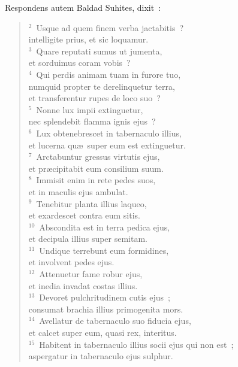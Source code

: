 \lettrine[lines=10,image=true,loversize=0.05,lraise=-0.03]{R}{}espondens autem Baldad Suhites, dixit~:
\begin{flushleft}\begin{verse}\vspace{6pt}${}^{2}$~Usque ad quem finem verba jactabitis~?\\ intelligite prius, et sic loquamur.\\
${}^{3}$~Quare reputati sumus ut jumenta,\\ et sorduimus coram vobis~?\\
${}^{4}$~Qui perdis animam tuam in furore tuo,\\ numquid propter te derelinquetur terra,\\ et transferentur rupes de loco suo~?\\
${}^{5}$~Nonne lux impii extinguetur,\\ nec splendebit flamma ignis ejus~?\\
${}^{6}$~Lux obtenebrescet in tabernaculo illius,\\ et lucerna qu\ae\ super eum est extinguetur.\\
${}^{7}$~Arctabuntur gressus virtutis ejus,\\ et pr\ae cipitabit eum consilium suum.\\
${}^{8}$~Immisit enim in rete pedes suos,\\ et in maculis ejus ambulat.\\
${}^{9}$~Tenebitur planta illius laqueo,\\ et exardescet contra eum sitis.\\
${}^{10}$~Abscondita est in terra pedica ejus,\\ et decipula illius super semitam.\\
${}^{11}$~Undique terrebunt eum formidines,\\ et involvent pedes ejus.\\
${}^{12}$~Attenuetur fame robur ejus,\\ et inedia invadat costas illius.\\
${}^{13}$~Devoret pulchritudinem cutis ejus~;\\ consumat brachia illius primogenita mors.\\
${}^{14}$~Avellatur de tabernaculo suo fiducia ejus,\\ et calcet super eum, quasi rex, interitus.\\
${}^{15}$~Habitent in tabernaculo illius socii ejus qui non est~;\\ aspergatur in tabernaculo ejus sulphur.\\

\end{verse}
\end{flushleft}
